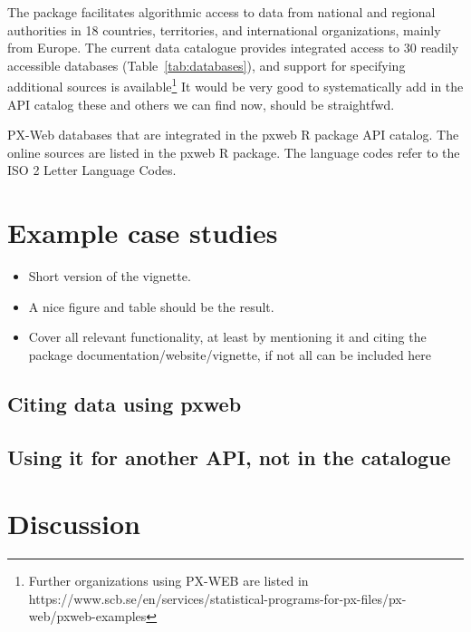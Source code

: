 The package facilitates algorithmic access to data from national and
regional authorities in 18 countries, territories, and international
organizations, mainly from Europe. The current data catalogue provides
integrated access to 30 readily accessible databases
(Table~\ref{tab:databases}), and support for specifying additional
sources is available\footnote{Further organizations using PX-WEB are
listed in
https://www.scb.se/en/services/statistical-programs-for-px-files/px-web/pxweb-examples} %
It would be very good to systematically add in the API catalog these
and others we can find now, should be straightfwd.

\begin{table}

\caption{\label{tab:databases}PX-Web databases that are integrated in the pxweb R package API catalog. The online sources are listed in the pxweb R package. The language codes refer to the ISO 2 Letter Language Codes.}
\end{table}


\section[Usage]{Example case studies}

\begin{itemize}
    \item Short version of the vignette.  \item A nice figure and
    table should be the result.  \item Cover all relevant
    functionality, at least by mentioning it and citing the package
    documentation/website/vignette, if not all can be included here
\end{itemize}




\subsection{Citing data using pxweb}

\subsection{Using it for another API, not in the catalogue}


\section[summary]{Discussion}

